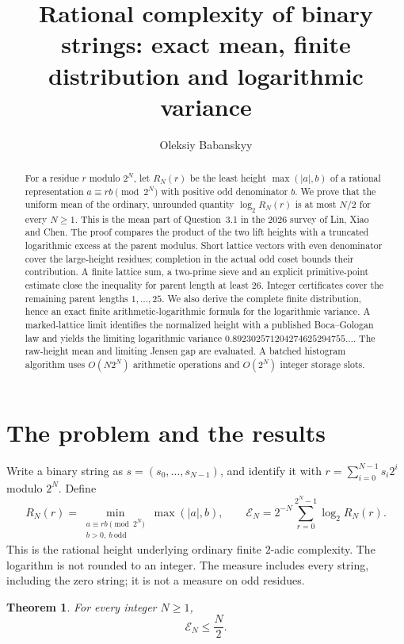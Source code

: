 \documentclass[11pt,a4paper]{article}
\title{Rational complexity of binary strings: exact mean, finite distribution and logarithmic variance}
\author{Oleksiy Babanskyy}
\date{}
\numberwithin{equation}{section}
\newtheorem{theorem}{Theorem}[section]
\theoremstyle{remark}
\newcommand{\odd}{\mathrm{odd}}
\begin{document}
\maketitle
\begin{abstract}
For a residue $r$ modulo $2^N$, let $R_N(r)$ be the least height
$\max(|a|,b)$ of a rational representation $a\equiv rb\pmod{2^N}$
with positive odd denominator $b$.
We prove that the uniform mean of the ordinary, unrounded quantity
$\log_2R_N(r)$ is at most $N/2$ for every $N\ge1$.
This is the mean part of Question~3.1 in the 2026 survey of Lin, Xiao and Chen.
The proof compares the product of the two lift heights with a truncated
logarithmic excess at the parent modulus. Short lattice vectors with even
denominator cover the large-height residues; completion in the actual odd
coset bounds their contribution. A finite lattice sum, a two-prime sieve
and an explicit primitive-point estimate close the inequality for parent
length at least $26$. Integer certificates cover the remaining parent
lengths $1,\ldots,25$. We also derive the complete finite distribution,
hence an exact finite arithmetic-logarithmic formula for the logarithmic
variance. A marked-lattice limit identifies the normalized height with
a published Boca--Gologan law and yields the limiting logarithmic
variance $0.892302571204274625294755\ldots$. The raw-height mean and
limiting Jensen gap are evaluated. A batched histogram algorithm uses
$O(N2^N)$ arithmetic operations and $O(2^N)$ integer storage slots.
\end{abstract}

\section{The problem and the results}
Write a binary string as $s=(s_0,\ldots,s_{N-1})$, and identify it with
$r=\sum_{i=0}^{N-1}s_i2^i$ modulo $2^N$. Define
\begin{equation}\label{eq:def}
 R_N(r)=\min_{\substack{a\equiv rb\pmod{2^N}\\b>0,\ b\ \odd}}
                   \max(|a|,b),\qquad
 \mathcal E_N=2^{-N}\sum_{r=0}^{2^N-1}\log_2R_N(r).
\end{equation}
This is the rational height underlying ordinary finite $2$-adic complexity.
The logarithm is not rounded to an integer. The measure includes every
string, including the zero string; it is not a measure on odd residues.

\begin{theorem}\label{thm:main}
For every integer $N\ge1$,
\[
                         \mathcal E_N\le \frac N2.
\]
\end{theorem}
\end{document}
